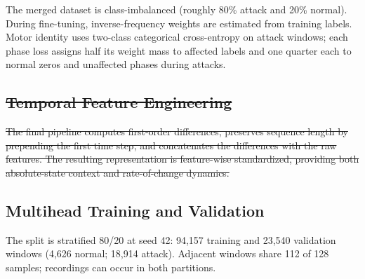 \documentclass[conference,letterpaper]{IEEEtran}
\providecommand{\DIFdel}[1]{{\protect\color{red}\sout{#1}}}                      %
\providecommand{\DIFdelbegin}{} %
\providecommand{\DIFdelend}{} %
\begin{document}
The merged dataset is class-imbalanced (roughly 80\% attack and 20\% normal). During fine-tuning, inverse-frequency weights are estimated from training labels. Motor identity uses two-class categorical cross-entropy on attack windows; each phase loss assigns half its weight mass to affected labels and one quarter each to normal zeros and unaffected phases during attacks.



\DIFdelbegin \subsection{\DIFdel{Temporal Feature Engineering}}
\addtocounter{subsection}{-1}%
\DIFdel{The final pipeline computes first-order differences, preserves sequence length by prepending the first time step, and concatenates the differences with the raw features. The resulting representation is feature-wise standardized, providing both absolute-state context and rate-of-change dynamics.
}%

\DIFdelend \subsection{Multihead Training and Validation}
The split is stratified 80/20 at seed 42: 94,157 training and 23,540 validation windows (4,626 normal; 18,914 attack). Adjacent windows share 112 of 128 samples; recordings can occur in both partitions.
\end{document}
